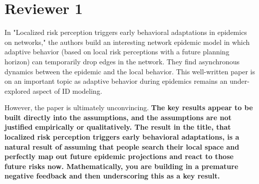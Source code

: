 \documentclass{article}
\newcommand{\blue}[1]{{\textcolor{blue}{#1}}}
\begin{document}

\bigskip
\section*{Reviewer 1}
In "Localized risk perception triggers early behavioral adaptations in epidemics on networks," the authors build an interesting network epidemic model in which adaptive behavior (based on local risk perceptions with a future planning horizon) can temporarily drop edges in the network. They find asynchronous dynamics between the epidemic and the local behavior. This well-written paper is on an important topic as adaptive behavior during epidemics remains an under-explored aspect of ID modeling.

However, the paper is ultimately unconvincing. 
\bf{
The key results appear to be built directly into the assumptions, and the assumptions are not justified empirically or qualitatively.
}
%
\bf{
The result in the title, that localized risk perception triggers early behavioral adaptations, is a natural result of assuming that people search their local space and perfectly map out future epidemic projections and react to those future risks now.
} 
Mathematically, you are building in a premature negative feedback and then underscoring this as a key result.
\end{document}

